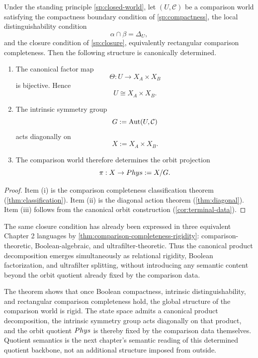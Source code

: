 \begin{theorem}
	\label{thm:part1-structural-completion}
	Under the standing principle \cref{sp:closed-world}, let
	$(U,\mathcal C)$ be a comparison world satisfying the compactness
	boundary condition of \cref{sp:compactness}, the local
	distinguishability condition
	\[
		\alpha\cap\beta=\Delta_U,
	\]
	and the closure condition of \cref{sp:closure}, equivalently
	rectangular comparison completeness.
	Then the following structure is canonically determined.
	\begin{enumerate}[label=\textup{(\roman*)}]
		\item
		      The canonical factor map
		      \[
			      \Theta:U\to X_A\times X_B
		      \]
		      is bijective. Hence
		      \[
			      U\cong X_A\times X_B .
		      \]
		\item
		      The intrinsic symmetry group
		      \[
			      G:=\operatorname{Aut}(U,\mathcal C)
		      \]
		      acts diagonally on
		      \[
			      X:=X_A\times X_B .
		      \]
		\item
		      The comparison world therefore determines the orbit projection
		      \[
			      \pi:X\to Phys:=X/G .
		      \]
	\end{enumerate}
\end{theorem}

\begin{proof}
	Item \textup{(i)} is the comparison completeness classification theorem
	(\cref{thm:classification}).
	Item \textup{(ii)} is the diagonal action theorem
	(\cref{thm:diagonal}).
	Item \textup{(iii)} follows from the canonical orbit construction
	(\cref{cor:terminal-data}).
\end{proof}

The same closure condition has already been expressed in three
equivalent Chapter 2 languages by
\cref{thm:comparison-completeness-rigidity}:
comparison-theoretic, Boolean-algebraic, and ultrafilter-theoretic.
Thus the canonical product decomposition emerges simultaneously as
relational rigidity, Boolean factorization, and ultrafilter splitting,
without introducing any semantic content beyond the orbit quotient
already fixed by the comparison data.

\begin{remark}[Interpretation]
	The theorem shows that once Boolean compactness, intrinsic
	distinguishability, and rectangular comparison completeness hold, the
	global structure of the comparison world is rigid. The state space
	admits a canonical product decomposition, the intrinsic symmetry group
	acts diagonally on that product, and the orbit quotient \(Phys\) is
	thereby fixed by the comparison data themselves.
	Quotient semantics is the next chapter's semantic reading of this
	determined quotient backbone, not an additional structure imposed from
	outside.
\end{remark}

